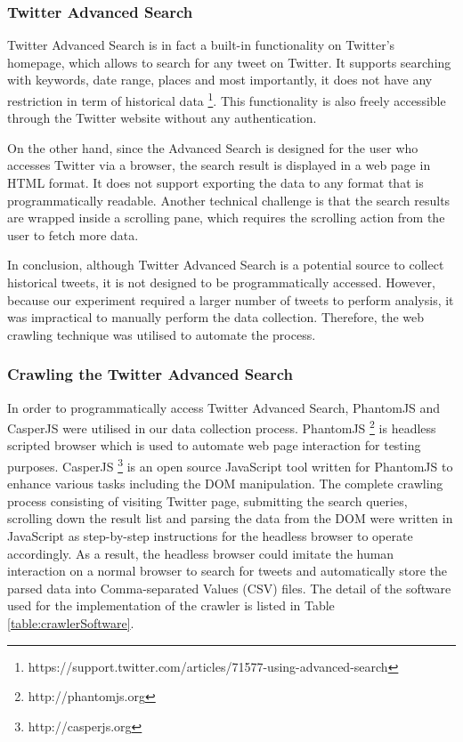 \subsubsection{Twitter Advanced Search}
Twitter Advanced Search is in fact a built-in functionality on Twitter's homepage, which allows to search for any tweet on Twitter. It supports searching with keywords, date range, places and most importantly, it does not have any restriction in term of historical data \footnote{https://support.twitter.com/articles/71577-using-advanced-search}. This functionality is also freely accessible through the Twitter website without any authentication.

On the other hand, since the Advanced Search is designed for the user who accesses Twitter via a browser, the search result is displayed in a web page in HTML format. It does not support exporting the data to any format that is programmatically readable. Another technical challenge is that the search results are wrapped inside a scrolling pane, which requires the scrolling action from the user to fetch more data. 

In conclusion, although Twitter Advanced Search is a potential source to collect historical tweets, it is not designed to be programmatically accessed. However, because our experiment required a larger number of tweets to perform analysis, it was impractical to manually perform the data collection. Therefore, the web crawling technique was utilised to automate the process.

\subsubsection{Crawling the Twitter Advanced Search}
In order to programmatically access Twitter Advanced Search, PhantomJS and CasperJS were utilised in our data collection process. PhantomJS \footnote{http://phantomjs.org} is headless scripted browser which is used to automate web page interaction for testing purposes. CasperJS \footnote{http://casperjs.org} is an open source JavaScript tool written for PhantomJS to enhance various tasks including the DOM manipulation. The complete crawling process consisting of visiting Twitter page, submitting the search queries, scrolling down the result list and parsing the data from the DOM were written in JavaScript as step-by-step instructions for the headless browser to operate accordingly. As a result, the headless browser could imitate the human interaction on a normal browser to search for tweets and automatically store the parsed data into Comma-separated Values (CSV) files. The detail of the software used for the implementation of the crawler is listed in Table \ref{table:crawlerSoftware}.

